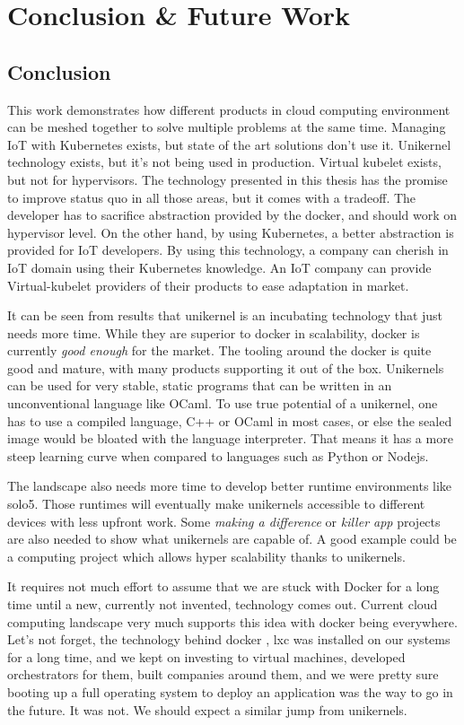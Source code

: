 \chapter{Conclusion \& Future Work}\label{chapter:conclusion}
\section{Conclusion}
This work demonstrates how different products in cloud computing environment can be meshed together to solve multiple problems at the same time. Managing IoT with Kubernetes exists, but state of the art solutions don't use it. Unikernel technology exists, but it's not being used in production. Virtual kubelet exists, but not for hypervisors. The technology presented in this thesis has the promise to improve status quo in all those areas, but it comes with a tradeoff. The developer has to sacrifice abstraction provided by the docker, and should work on hypervisor level. On the other hand, by using Kubernetes, a better abstraction is provided for IoT developers. By using this technology, a company can cherish in IoT domain using their Kubernetes knowledge. An IoT company can provide Virtual-kubelet providers of their products to ease adaptation in market.

It can be seen from results that unikernel is an incubating technology that just needs more time. While they are superior to docker in scalability, docker is currently \textit{good enough} for the market. The tooling around the docker is quite good and mature, with many products supporting it out of the box. Unikernels can be used for very stable, static programs that can be written in an unconventional language like OCaml. To use true potential of a unikernel, one has to use a compiled language, C++ or OCaml in most cases, or else the sealed image would be bloated with the language interpreter. That means it has a more steep learning curve when compared to languages such as Python or Nodejs.

The landscape also needs more time to develop better runtime environments like solo5. Those runtimes will eventually make unikernels accessible to different devices with less upfront work. Some \textit{making a difference} or \textit{killer app} projects are also needed to show what unikernels are capable of. A good example could be a computing project which allows hyper scalability thanks to unikernels.

It requires not much effort to assume that we are stuck with Docker for a long time until a new, currently not invented, technology comes out. Current cloud computing landscape very much supports this idea with docker being everywhere. Let's not forget, the technology behind docker , lxc was installed on our systems for a long time, and we kept on investing to virtual machines, developed orchestrators for them, built companies around them, and we were pretty sure booting up a full operating system to deploy an application was the way to go in the future. It was not. We should expect a similar jump from unikernels.


